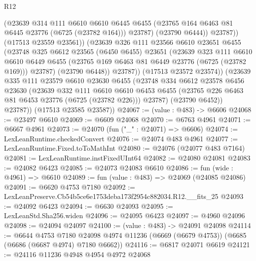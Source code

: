 \begin{lexlean}{R12}
\begin{coremodule}
                    (@23639
                      @314
                      @111
                      @6610
                      @6610
                      @6445
                      @6455
                      (@23765 @164 @6463 @81 @6445 @23776 (@6725 (@23782 @164)))
                      @23787)
                    (@23790 @6444))
                  @23787))
              (@17513 @23559 @23561))
            (@23639
              @326
              @111
              @23566
              @6610
              @23651
              @6455
              (@23748
                @325
                @6612
                @23565
                (@6450 @6455)
                @23651
                (@23639
                  @323
                  @111
                  @6610
                  @6610
                  @6449
                  @6455
                  (@23765 @169 @6463 @81 @6449 @23776 (@6725 (@23782 @169)))
                  @23787)
                (@23790 @6448))
              @23787))
          (@17513 @23572 @23574))
        (@23639
          @335
          @111
          @23579
          @6610
          @23630
          @6455
          (@23748
            @334
            @6612
            @23578
            @6456
            @23630
            (@23639
              @332
              @111
              @6610
              @6610
              @6453
              @6455
              (@23765 @226 @6463 @81 @6453 @23776 (@6725 (@23782 @226)))
              @23787)
            (@23790 @6452))
          @23787))
      (@17513 @23585 @23587))
@24067 := (value : @483) -> @6606
@24068 := @23497 @6610
@24069 := @6609 @24068
@24070 := @6763 @4961
@24071 := @6667 @4961
@24073 := @24070 (fun ("_" : @24071) => @6606)
@24074 := LexLeanRuntime.checkedConvert
@24076 := @24074 @483 @4961
@24077 := LexLeanRuntime.Fixed.toToMathInt
@24080 := @24076 (@24077 @483 @7164)
@24081 := LexLeanRuntime.instFixedUInt64
@24082 := @24080 @24081
@24083 := @24082 @6423
@24085 := @24073 @24083 @6610
@24086 := fun (wide : @4961) => @6610
@24089 := fun (value : @483) => @24069 (@24085 @24086)
@24091 := @6620 @4753 @7180
@24092 := LexLeanPreserve.Cb54b5ce6e1753deba173f2954c882034.R12.__fits_25
@24093 := @24092 @6423
@24094 := @6630 @24093
@24095 := LexLeanStd.Sha256.widen
@24096 := @24095 @6423
@24097 := @4960 @24096
@24098 := @24094 @24097
@24100 := (value : @483) -> @24091 @24098
@24114 := @6644
    @4753
    @7180
    @24098
    @4974
    @11236
    (@6669 (@6679 @4753))
    (@6685 (@6686 (@6687 @4974) @7180 @6662))
@24116 := @6817 @24071 @6619
@24121 := @24116 @11236 @4948 @4954 @4972 @24068

\end{coremodule}
\end{lexlean}
